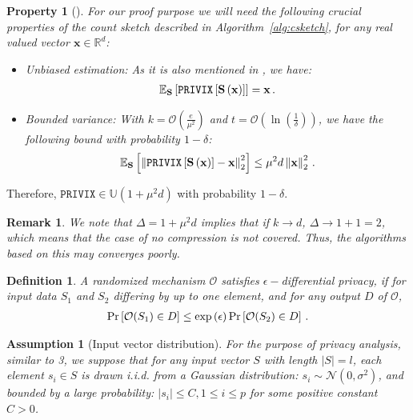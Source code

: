 \documentclass{article}
\newtheorem{property}{Property}
\newtheorem{assumption}{Assumption}
\newtheorem{definition}{Definition}
\newtheorem{remark}{Remark}
\begin{document}
\begin{property}[\cite{li2019privacy}]
For our proof purpose we will need the following crucial properties of the count sketch described in Algorithm~\ref{alg:csketch}, for any real valued vector $\mathbf{x}\in \mathbb{R}^{d}$:
\begin{itemize}
    \item[1)] \emph{Unbiased estimation}: As it is also mentioned in \cite{li2019privacy}, we have:
    \begin{align}\notag
        \mathbb{E}_{\mathbf{S}}\left[\texttt{PRIVIX}\left[\mathbf{S}\left(\mathbf{x}\right)\right]\right]=\mathbf{x}\, .
    \end{align}
    \item[2)] \emph{Bounded variance}: With $k=\mathcal{O}\left(\frac{e}{\mu^2}\right)$ and $t=\mathcal{O}\left(\ln \left(\frac{1}{\delta}\right)\right)$, we have the following bound with probability $1-\delta$:
    \begin{align}\notag
        \mathbb{E}_{\mathbf{S}}\left[\left\|\texttt{PRIVIX}\left[\mathbf{S}\left(\mathbf{x}\right)\right]-\mathbf{x}\right\|_2^2\right]\leq \mu^2 d\left\|\mathbf{x}\right\|_2^2\, .
    \end{align}
\end{itemize}
\end{property}
Therefore, $\texttt{PRIVIX}\in \mathbb{U}(1+\mu^2 d)$ with probability $1-\delta$.
\begin{remark}
We note that $\Delta=1+\mu^2d$ implies that if $k\rightarrow d$, $\Delta\rightarrow 1+1=2$, which means that the case of no compression is not covered. Thus, the algorithms based on this may converges poorly.
\end{remark}

\begin{definition}
A randomized mechanism $\mathcal{O}$ satisfies $\epsilon-$differential privacy, if for input data ${S}_1$ and ${S}_2$ differing by up to one element, and for any output $D$ of $\mathcal{O}$,
\begin{align}\notag
    \Pr\left[\mathcal{O}(S_1)\in D\right]\leq \exp{\left(\epsilon\right)}\Pr\left[\mathcal{O}(S_2)\in D\right] \, .
\end{align}
\end{definition}


\begin{assumption}[Input vector distribution]\label{assu:invecdist}
For the purpose of privacy analysis, similar to 3, we suppose that for any input vector $S$ with length $|S|=l$, each element $s_i\in S$ is drawn i.i.d. from a Gaussian distribution: $s_i\sim \mathcal{N}(0,\sigma^2)$, and bounded by a large probability:  $|s_i|\leq C, 1\leq i\leq p$ for some positive constant $C>0$.    
\end{assumption}
\end{document}
